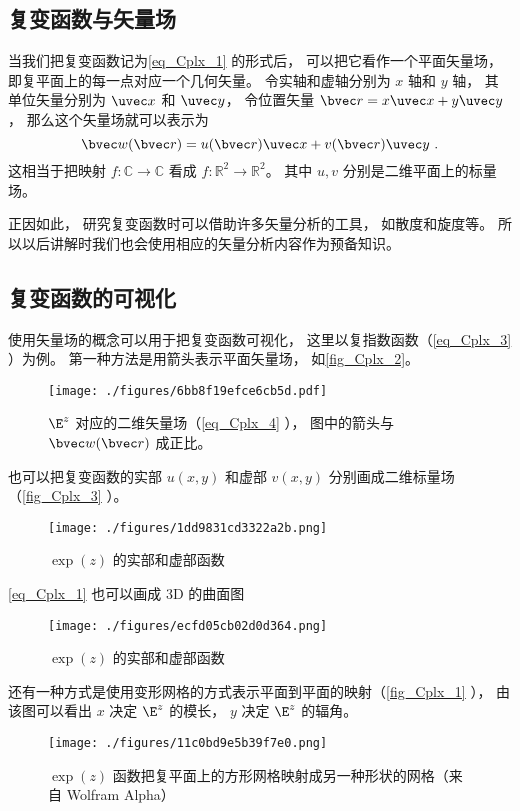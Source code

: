 \subsection{复变函数与矢量场}
当我们把复变函数记为\autoref{eq_Cplx_1} 的形式后， 可以把它看作一个平面矢量场， 即复平面上的每一点对应一个几何矢量。 令实轴和虚轴分别为 $x$ 轴和 $y$ 轴， 其单位矢量分别为 $\uvec x$ 和 $\uvec y$， 令位置矢量 $\bvec r = x \uvec x + y \uvec y$， 那么这个矢量场就可以表示为
\begin{equation}\label{eq_Cplx_4}
\bvec w(\bvec r) = u(\bvec r) \uvec x + v(\bvec r) \uvec y~.
\end{equation}
这相当于把映射 $f:\mathbb C \to \mathbb C$ 看成 $f: \mathbb R^2 \to \mathbb R^2$。 其中 $u, v$ 分别是二维平面上的标量场。

正因如此， 研究复变函数时可以借助许多矢量分析的工具， 如散度和旋度等。 所以以后讲解时我们也会使用相应的矢量分析内容作为预备知识。

\subsection{复变函数的可视化}
使用矢量场的概念可以用于把复变函数可视化， 这里以复指数函数（\autoref{eq_Cplx_3} ）为例。 第一种方法是用箭头表示平面矢量场， 如\autoref{fig_Cplx_2}。
\begin{figure}[ht]
\centering
\texttt{[image: ./figures/6bb8f19efce6cb5d.pdf]}
\caption{$\E^z$ 对应的二维矢量场（\autoref{eq_Cplx_4} ）， 图中的箭头与 $\bvec w(\bvec r)$ 成正比。} \label{fig_Cplx_2}
\end{figure}
也可以把复变函数的实部 $u(x,y)$ 和虚部 $v(x, y)$ 分别画成二维标量场（\autoref{fig_Cplx_3} ）。
\begin{figure}[ht]
\centering
\texttt{[image: ./figures/1dd9831cd3322a2b.png]}
\caption{$\exp(z)$ 的实部和虚部函数} \label{fig_Cplx_3}
\end{figure}
\autoref{eq_Cplx_1} 也可以画成 3D 的曲面图
\begin{figure}[ht]
\centering
\texttt{[image: ./figures/ecfd05cb02d0d364.png]}
\caption{$\exp(z)$ 的实部和虚部函数} \label{fig_Cplx_4}
\end{figure}

还有一种方式是使用变形网格的方式表示平面到平面的映射（\autoref{fig_Cplx_1} ）， 由该图可以看出 $x$ 决定 $\E^z$ 的模长， $y$ 决定 $\E^z$ 的辐角。
\begin{figure}[ht]
\centering
\texttt{[image: ./figures/11c0bd9e5b39f7e0.png]}
\caption{$\exp(z)$ 函数把复平面上的方形网格映射成另一种形状的网格（来自 Wolfram Alpha）} \label{fig_Cplx_1}
\end{figure}

